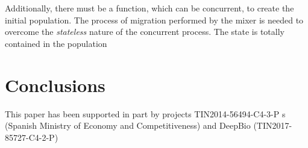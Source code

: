 \documentclass[sigconf]{acmart}
\begin{document}
Additionally, there must be a function, which can be concurrent, to
create the initial population. The process of migration performed by
the mixer is needed to overcome the {\em stateless}
nature of the concurrent process. The state is totally contained in
the population


\section{Conclusions}
\label{sec:conclusions}

\begin{acks}

  This paper has been supported in part by
projects TIN2014-56494-C4-3-P s (Spanish Ministry of Economy and
Competitiveness) and DeepBio (TIN2017-85727-C4-2-P)


\end{acks}




\end{document}
